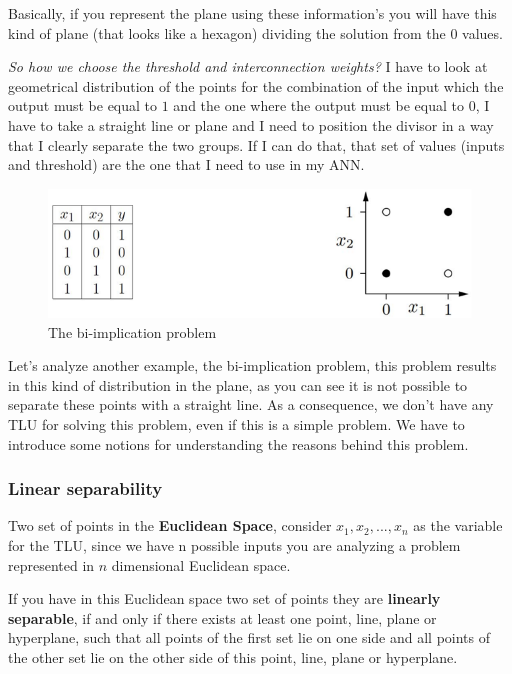 \documentclass{article}
\begin{document}
Basically, if you represent the plane using these information’s you will have this
kind of plane (that looks like a hexagon) dividing the solution from the $0$ values.

\textit{So how we choose the threshold and interconnection weights?} I have to look at geometrical
distribution of the points for the combination of the input which the output must be equal to $1$
and the one where the output must be equal to $0$, I have to take a straight line or plane and I
need to position the divisor in a way that I clearly separate the two groups. If I can do that,
that set of values (inputs and threshold) are the one that I need to use in my ANN.

\begin{figure}[H]
    \centering
    \includegraphics[scale=0.6]{images/bi_implic_no_sol.png}
    \caption{The bi-implication problem}
    \label{fig:bi-impl-problem}
\end{figure}

Let’s analyze another example, the bi-implication problem, this problem results in this kind of
distribution in the plane, as you can see it is not possible to separate these points with a
straight line. As a consequence, we don’t have any TLU for solving this problem, even if this is
a simple problem. We have to introduce some notions for understanding the reasons behind
this problem.
\subsubsection{Linear separability}
Two set of points in the \textbf{Euclidean Space}, consider $x_1, x_2,...,x_n$ as the variable for
the TLU, since we have n possible inputs you are analyzing a problem represented in $n$
dimensional Euclidean space.

If you have in this Euclidean space two set of points they are \textbf{linearly separable},
if and only if there exists at least one point, line, plane or hyperplane, such that all
points of the first set lie on one side and all points of the other set lie on the
other side of this point, line, plane or hyperplane.
\end{document}
